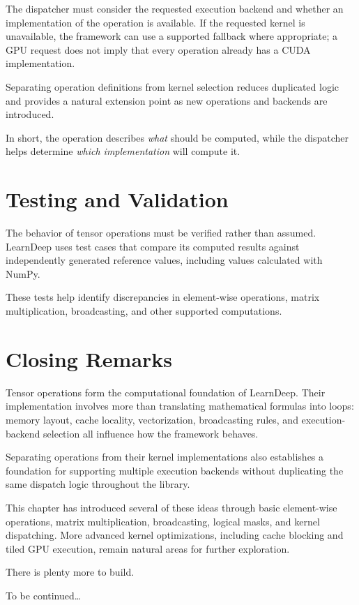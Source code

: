 The dispatcher must consider the requested execution backend and whether an implementation of the operation is available. If the requested kernel is unavailable, the framework can use a supported fallback where appropriate; a GPU request does not imply that every operation already has a CUDA implementation.

Separating operation definitions from kernel selection reduces duplicated logic and provides a natural extension point as new operations and backends are introduced.

In short, the operation describes \emph{what} should be computed, while the dispatcher helps determine \emph{which implementation} will compute it.

\section{Testing and Validation}

The behavior of tensor operations must be verified rather than assumed. LearnDeep uses test cases that compare its computed results against independently generated reference values, including values calculated with NumPy.

These tests help identify discrepancies in element-wise operations, matrix multiplication, broadcasting, and other supported computations.

%

\section{Closing Remarks}

Tensor operations form the computational foundation of LearnDeep. Their implementation involves more than translating mathematical formulas into loops: memory layout, cache locality, vectorization, broadcasting rules, and execution-backend selection all influence how the framework behaves.

Separating operations from their kernel implementations also establishes a foundation for supporting multiple execution backends without duplicating the same dispatch logic throughout the library.

This chapter has introduced several of these ideas through basic element-wise operations, matrix multiplication, broadcasting, logical masks, and kernel dispatching. More advanced kernel optimizations, including cache blocking and tiled GPU execution, remain natural areas for further exploration.

There is plenty more to build.

To be continued\ldots